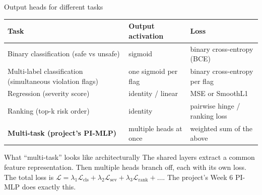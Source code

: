 \documentclass[aspectratio=169,10pt]{beamer}
\begin{document}
\begin{frame}{Output heads for different tasks}
\centering
\scriptsize
\begin{tabular}{@{}p{}p{}p{}@{}}
\toprule
Task & Output activation & Loss \\
\midrule
Binary classification (safe vs unsafe) & sigmoid & binary cross-entropy (BCE) \\
Multi-label classification (simultaneous violation flags) & one sigmoid per flag & binary cross-entropy per flag \\
Regression (severity score) & identity / linear & MSE or SmoothL1 \\
Ranking (top-k risk order) & identity & pairwise hinge / ranking loss \\
\textbf{Multi-task (project's PI-MLP)} & multiple heads at once & weighted sum of the above \\
\bottomrule
\end{tabular}
\vspace{0.6em}
\begin{block}{What ``multi-task'' looks like architecturally}
The shared layers extract a common feature representation. Then multiple heads branch off, each with its own loss. The total loss is $\mathcal{L} = \lambda_1 \mathcal{L}_{\text{cls}} + \lambda_2 \mathcal{L}_{\text{sev}} + \lambda_3 \mathcal{L}_{\text{rank}} + \ldots$. The project's Week 6 PI-MLP does exactly this.
\end{block}
\end{frame}
\end{document}
